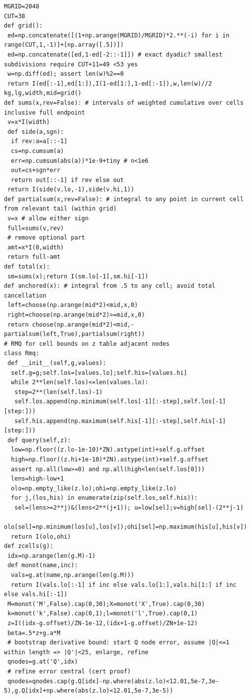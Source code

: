 \documentclass[11pt,a4paper]{article}
\numberwithin{equation}{section}
\theoremstyle{definition}
\theoremstyle{remark}
\begin{document}
\begin{lstlisting}
MGRID=2048
CUT=38
def grid():
 ed=np.concatenate([(1+np.arange(MGRID)/MGRID)*2.**(-i) for i in range(CUT,1,-1)]+[np.array([.5])])
 ed=np.concatenate([ed,1-ed[-2::-1]]) # exact dyadic? smallest subdivisions require CUT+11=49 <53 yes
 w=np.diff(ed); assert len(w)%2==0
 return I(ed[:-1],ed[1:]),I(1-ed[1:],1-ed[:-1]),w,len(w)//2
kg,lg,width,mid=grid()
def sums(x,rev=False): # intervals of weighted cumulative over cells inclusive full endpoint
 v=x*I(width)
 def side(a,sgn):
  if rev:a=a[::-1]
  cs=np.cumsum(a)
  err=np.cumsum(abs(a))*1e-9+tiny # n<1e6
  out=cs+sgn*err
  return out[::-1] if rev else out
 return I(side(v.lo,-1),side(v.hi,1))
def partialsum(x,rev=False): # integral to any point in current cell from relevant tail (within grid)
 v=x # allow either sign
 full=sums(v,rev)
 # remove optional part
 amt=x*I(0,width)
 return full-amt
def total(x):
 sm=sums(x);return I(sm.lo[-1],sm.hi[-1])
def anchored(x): # integral from .5 to any cell; avoid total cancellation
 left=choose(np.arange(mid*2)<mid,x,0)
 right=choose(np.arange(mid*2)>=mid,x,0)
 return choose(np.arange(mid*2)<mid,-partialsum(left,True),partialsum(right))
# RMQ for cell bounds on z table adjacent nodes
class Rmq:
 def __init__(self,g,values):
  self.g=g;self.los=[values.lo];self.his=[values.hi]
  while 2**len(self.los)<=len(values.lo):
   step=2**(len(self.los)-1)
   self.los.append(np.minimum(self.los[-1][:-step],self.los[-1][step:]))
   self.his.append(np.maximum(self.his[-1][:-step],self.his[-1][step:]))
 def query(self,z):
  low=np.floor((z.lo-1e-10)*ZN).astype(int)+self.g.offset
  high=np.floor((z.hi+1e-10)*ZN).astype(int)+self.g.offset
  assert np.all(low>=0) and np.all(high<len(self.los[0]))
  lens=high-low+1
  olo=np.empty_like(z.lo);ohi=np.empty_like(z.lo)
  for j,(los,his) in enumerate(zip(self.los,self.his)):
   sel=(lens>=2**j)&(lens<2**(j+1)); u=low[sel];v=high[sel]-(2**j-1)
   olo[sel]=np.minimum(los[u],los[v]);ohi[sel]=np.maximum(his[u],his[v])
  return I(olo,ohi)
def zcells(g):
 idx=np.arange(len(g.M)-1)
 def monot(name,inc):
  vals=g.at(name,np.arange(len(g.M)))
  return I(vals.lo[:-1] if inc else vals.lo[1:],vals.hi[1:] if inc else vals.hi[:-1])
 M=monot('M',False).cap(0,30);X=monot('X',True).cap(0,30)
 k=monot('k',False).cap(0,1);l=monot('l',True).cap(0,1)
 z=I((idx-g.offset)/ZN-1e-12,(idx+1-g.offset)/ZN+1e-12)
 beta=.5*z+g.a*M
 # bootstrap derivative bound: start Q node error, assume |Q|<=1 within length => |Q'|<25, enlarge, refine
 qnodes=g.at('Q',idx)
 # refine error central (cert proof)
 qnodes=qnodes.cap(g.Q[idx]-np.where(abs(z.lo)<12.01,5e-7,3e-5),g.Q[idx]+np.where(abs(z.lo)<12.01,5e-7,3e-5))

\end{lstlisting}
\end{document}
